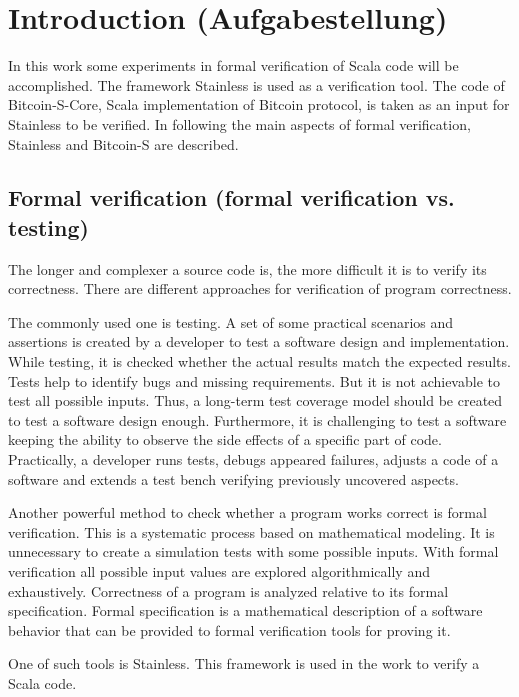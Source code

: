 \chapter{Introduction (Aufgabestellung)}
\label{chap:introduction}
In this work some experiments in formal verification of Scala code will be accomplished. 
The framework Stainless is used as a verification tool. The code of Bitcoin-S-Core, Scala implementation of Bitcoin protocol, is taken as an input for Stainless to be verified. 
In following the main aspects of formal verification, Stainless and Bitcoin-S are described.


\section{Formal verification (formal verification vs. testing)}
\label{sec:formal_verification}

The longer and complexer a source code is, the more difficult it is to verify its correctness.
There are different approaches for verification of program correctness. 

The commonly used one is testing.
A set of some practical scenarios and assertions is created by a developer to test a software design and implementation. 
While testing, it is checked whether the actual results match the expected results.
Tests help to identify bugs and missing requirements.
But it is not achievable to test all possible inputs. 
Thus, a long-term test coverage model should be created to test a software design enough.
Furthermore, it is challenging to test a software keeping the ability to observe the side effects of a specific part of code.
Practically, a developer runs tests, debugs appeared failures, adjusts a code of a software and extends a test bench verifying previously uncovered aspects. \cite{sanghavi:formal_verification}

Another powerful method to check whether a program works correct is formal verification. 
This is a systematic process based on mathematical modeling. 
It is unnecessary to create a simulation tests with some possible inputs. 
With formal verification all possible input values are explored algorithmically and exhaustively.
Correctness of a program is analyzed relative to its formal specification.
Formal specification is a mathematical description of a software behavior that can be provided to formal verification tools for proving it. \cite{sanghavi:formal_verification}

One of such tools is Stainless.
This framework is used in the work to verify a Scala code.


